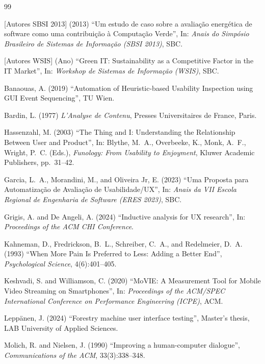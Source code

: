 \documentclass[12pt]{article}
\begin{document}
\begin{thebibliography}{99}

[Autores SBSI 2013] (2013) ``Um estudo de caso sobre a avaliação energética de
software como uma contribuição à Computação Verde'', In: \textit{Anais do
Simpósio Brasileiro de Sistemas de Informação (SBSI 2013)}, SBC.

[Autores WSIS] (Ano) ``Green IT: Sustainability as a Competitive Factor in the
IT Market'', In: \textit{Workshop de Sistemas de Informação (WSIS)}, SBC.

Banaouas, A. (2019) ``Automation of Heuristic-based Usability Inspection using
GUI Event Sequencing'', TU Wien.

Bardin, L. (1977) \textit{L'Analyse de Contenu}, Presses Universitaires de
France, Paris.

Hassenzahl, M. (2003) ``The Thing and I: Understanding the Relationship Between
User and Product'', In: Blythe, M.~A., Overbeeke, K., Monk, A.~F., Wright,
P.~C. (Eds.), \textit{Funology: From Usability to Enjoyment}, Kluwer Academic
Publishers, pp.~31--42.

Garcia, L.~A., Morandini, M., and Oliveira Jr, E. (2023) ``Uma Proposta para
Automatização de Avaliação de Usabilidade/UX'', In: \textit{Anais da VII
Escola Regional de Engenharia de Software (ERES 2023)}, SBC.

Grigis, A. and De Angeli, A. (2024) ``Inductive analysis for UX research'',
In: \textit{Proceedings of the ACM CHI Conference}.

Kahneman, D., Fredrickson, B.~L., Schreiber, C.~A., and Redelmeier, D.~A.
(1993) ``When More Pain Is Preferred to Less: Adding a Better End'',
\textit{Psychological Science}, 4(6):401--405.

Keshvadi, S. and Williamson, C. (2020) ``MoVIE: A Measurement Tool for Mobile
Video Streaming on Smartphones'', In: \textit{Proceedings of the ACM/SPEC
International Conference on Performance Engineering (ICPE)}, ACM.

Leppänen, J. (2024) ``Forestry machine user interface testing'', Master's
thesis, LAB University of Applied Sciences.

Molich, R. and Nielsen, J. (1990) ``Improving a human-computer dialogue'',
\textit{Communications of the ACM}, 33(3):338--348.


\end{thebibliography}
\end{document}
